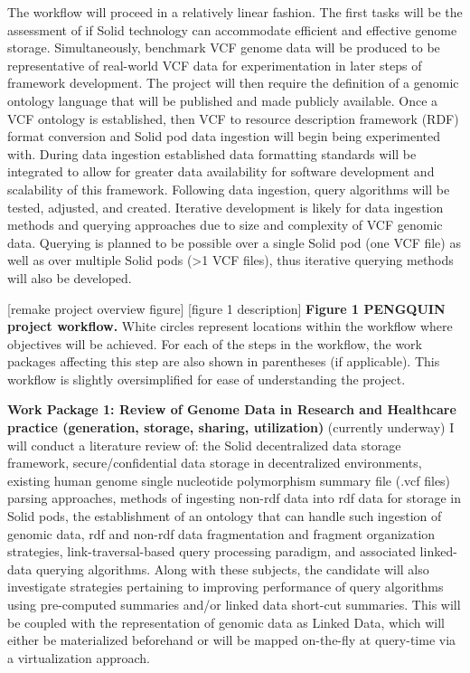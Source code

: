 \documentclass[11pt]{article}
\begin{document}
The workflow will proceed in a relatively linear fashion. 
The first tasks will be the assessment of if Solid technology can accommodate efficient and effective genome storage. 
Simultaneously, benchmark VCF genome data will be produced to be representative of real-world VCF data for experimentation in later steps of framework development. 
The project will then require the definition of a genomic ontology language that will be published and made publicly available. 
Once a VCF ontology is established, then VCF to resource description framework (RDF) format conversion and Solid pod data ingestion will begin being experimented with. 
During data ingestion established data formatting standards will be integrated to allow for greater data availability for software development and scalability of this framework. 
Following data ingestion, query algorithms will be tested, adjusted, and created. Iterative development is likely for data ingestion methods and querying approaches due to size and complexity of VCF genomic data. 
Querying is planned to be possible over a single Solid pod (one VCF file) as well as over multiple Solid pods (>1 VCF files), thus iterative querying methods will also be developed. 

[remake project overview figure]
[figure 1 description]
\textbf{Figure 1 PENGQUIN project workflow.} 
White circles represent locations within the workflow where objectives will be achieved. 
For each of the steps in the workflow, the work packages affecting this step are also shown in parentheses (if applicable). 
This workflow is slightly oversimplified for ease of understanding the project.

\textbf{Work Package 1: Review of Genome Data in Research and Healthcare practice (generation, storage, sharing, utilization)} (currently underway)
I will conduct a literature review of: the Solid decentralized data storage framework, secure/confidential data storage in decentralized environments, existing human genome single nucleotide polymorphism summary file (.vcf files) parsing approaches, methods of ingesting non-rdf data into rdf data for storage in Solid pods, the establishment of an ontology that can handle such ingestion of genomic data, rdf and non-rdf data fragmentation and fragment organization strategies, link-traversal-based query processing paradigm, and associated linked-data querying algorithms. 
Along with these subjects, the candidate will also investigate strategies pertaining to improving performance of query algorithms using pre-computed summaries and/or linked data short-cut summaries. 
This will be coupled with the representation of genomic data as Linked Data, which will either be materialized beforehand or will be mapped on-the-fly at query-time via a virtualization approach.
\end{document}
